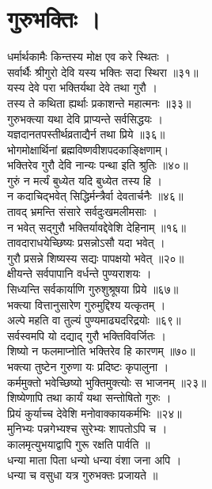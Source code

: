 \section{गुरुभक्तिः ।}

धर्मार्थकामैः किन्तस्य मोक्ष एव करे स्थितः ।\\[-2mm]
सर्वार्थैः श्रीगुरो देवि यस्य भक्तिः सदा स्थिरा ॥३१॥\\
यस्य देवे परा भक्तिर्यथा  देवे तथा गुरौ ।\\[-2mm]
तस्य ते कथिता ह्यर्थाः प्रकाशन्ते महात्मनः ॥३३॥\\
गुरुभक्त्या यथा देवि प्राप्यन्ते सर्वसिद्धयः ।\\[-2mm]
यज्ञदानतपस्तीर्थव्रताद्यैर्न तथा प्रिये ॥३६॥\\
भोगमोक्षार्थिनां ब्रह्मविष्णवीशपदकाङ्क्षिणाम्।\\[-2mm]
भक्तिरेव गुरौ देवि नान्यः पन्था इति श्रुतिः ॥४०॥\\
गुरुं न मर्त्यं बुध्येत यदि बुध्येत तस्य हि ।\\[-2mm]
न कदाचिद्भवेत् सिद्धिर्मन्त्रैर्वा देवतार्चनैः ॥४६॥\\
तावद् भ्रमन्ति संसारे सर्वदुःखमलीमसाः ।\\[-2mm]
न भवेत् सद्गुरौ भक्तिर्यावद्देवेशि देहिनाम् ॥१६॥\\
तावदाराधयेच्छिष्यः प्रसन्नोऽसौ यदा भवेत् ।\\[-2mm]
गुरौ प्रसन्ने शिष्यस्य सद्यः पापक्षयो भवेत् ॥२०॥\\
क्षीयन्ते सर्वपापानि वर्धन्ते पुण्यराशयः ।\\[-2mm]
सिध्यन्ति सर्वकार्याणि गुरुशुश्रूषया प्रिये ॥६७॥\\
भक्त्या वित्तानुसारेण गुरुमुद्दिश्य यत्कृतम् ।\\[-2mm]
अल्पे महति वा तुल्यं पुण्यमाढ्यदरिद्रयोः ॥६९॥\\
सर्वस्वमपि यो दद्याद् गुरौ भक्तिविवर्जितः ।\\[-2mm]
शिष्यो न फलमाप्नोति भक्तिरेव हि कारणम् ॥७०॥\\
भक्त्या तुष्टेन गुरुणा यः प्रदिष्टः कृपालुना ।\\[-2mm]
कर्ममुक्तो भवेच्छिष्यो भुक्तिमुक्त्योः स भाजनम् ॥२३॥\\
शिष्येणापि तथा कार्यं यथा सन्तोषितो गुरुः ।\\[-2mm]
प्रियं कुर्याच्च देवेशि मनोवाक्कायकर्मभिः ॥२४॥\\
मुनिभ्यः पन्नगेभ्यश्च सुरेभ्यः शापतोऽपि च ।\\[-2mm]
कालमृत्युभयाद्वापि गुरू रक्षति पार्वति ॥\\
धन्या माता पिता धन्यो धन्या वंशा जना अपि ।\\[-2mm]
धन्या च वसुधा यत्र गुरुभक्तः प्रजायते ॥\\

